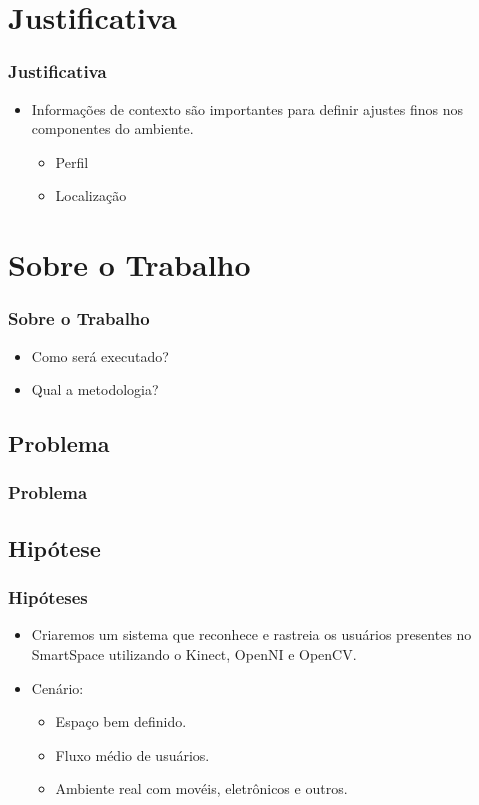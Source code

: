 \documentclass{beamer}
\begin{document}
\section{Justificativa} 
\begin{frame}
    \frametitle{Justificativa}
    \begin{itemize}
      \item Informações de contexto são importantes para definir ajustes finos nos componentes do ambiente.
	    \begin{itemize}
		\item Perfil
		\item Localização
	    \end{itemize}
    \end{itemize}
\end{frame}


\section{Sobre o Trabalho}
\begin{frame}
    \frametitle{Sobre o Trabalho}
    \begin{itemize}
        \item Como será executado?
        \item Qual a metodologia?
    \end{itemize}
\end{frame}


\subsection{Problema}
\begin{frame}
    \frametitle{Problema}

\end{frame}


\subsection{Hipótese}
\begin{frame}
    \frametitle{Hipóteses}
    \begin{itemize}
      \item Criaremos um sistema que reconhece e rastreia os usuários presentes no SmartSpace utilizando o Kinect, OpenNI e OpenCV.

      \item Cenário:
        \begin{itemize}
            \item Espaço bem definido.
            \item Fluxo médio de usuários.
            \item Ambiente real com movéis, eletrônicos e outros.
        \end{itemize} 
    \end{itemize}
\end{frame}
\end{document}
